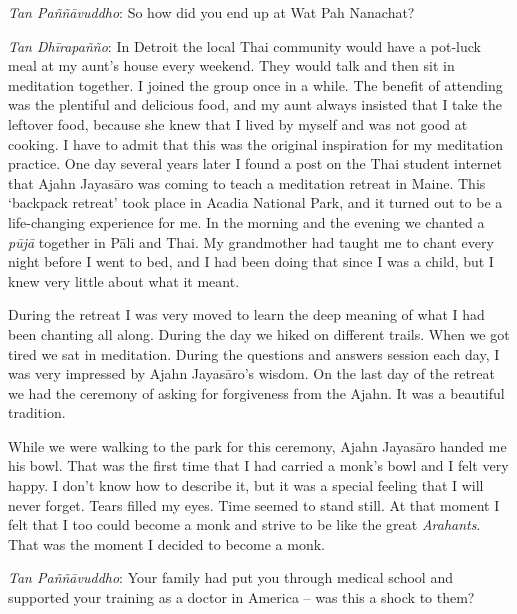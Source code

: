 \emph{Tan Paññāvuddho}: So how did you end up at Wat Pah Nanachat? 

\emph{Tan Dhīrapañño}: In Detroit the local Thai community would have a
pot-luck meal at my aunt's house every weekend. They would talk and then
sit in meditation together. I joined the group once in a while. The
benefit of attending was the plentiful and delicious food, and my aunt
always insisted that I take the leftover food, because she knew that I
lived by myself and was not good at cooking. I have to admit that this
was the original inspiration for my meditation practice. One day several
years later I found a post on the Thai student internet that Ajahn
Jayasāro was coming to teach a meditation retreat in Maine. This
`backpack retreat' took place in Acadia National Park, and it turned out
to be a life-changing experience for me. In the morning and the evening
we chanted a \emph{pūjā} together in Pāli and Thai. My grandmother had
taught me to chant every night before I went to bed, and I had been
doing that since I was a child, but I knew very little about what it
meant.

During the retreat I was very moved to learn the deep meaning of
what I had been chanting all along. During the day we hiked on different
trails. When we got tired we sat in meditation. During the questions and
answers session each day, I was very impressed by Ajahn Jayasāro's
wisdom. On the last day of the retreat we had the ceremony of asking for
forgiveness from the Ajahn. It was a beautiful tradition.

While we were
walking to the park for this ceremony, Ajahn Jayasāro handed me his
bowl. That was the first time that I had carried a monk's bowl and I
felt very happy. I don't know how to describe it, but it was a special
feeling that I will never forget. Tears filled my eyes. Time seemed to
stand still. At that moment I felt that I too could become a monk and
strive to be like the great \emph{Arahants}. That was the moment I
decided to become a monk. 

\emph{Tan Paññāvuddho}: Your family had put you through medical school
and supported your training as a doctor in America -- was this a shock
to them? 

